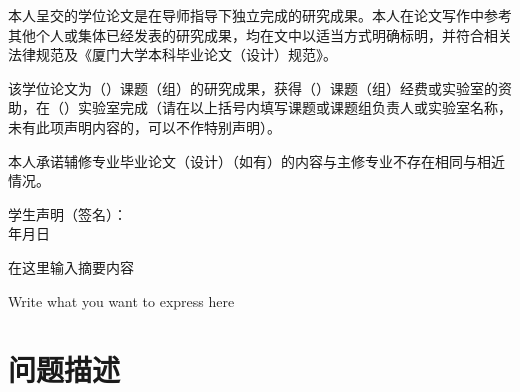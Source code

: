 \documentclass[14pt,a4paper]{xmuthesis}
\begin{document}
\begin{center}
\end{center}
\vspace{1cm}

本人呈交的学位论文是在导师指导下独立完成的研究成果。本人在论文写作中参考其他个人或集体已经发表的研究成果，均在文中以适当方式明确标明，并符合相关法律规范及《厦门大学本科毕业论文（设计）规范》。

该学位论文为（\hspace{13em}）课题（组）的研究成果，获得（\hspace{7em}）课题（组）经费或实验室的资助，在（\hspace{6em}）实验室完成（请在以上括号内填写课题或课题组负责人或实验室名称，未有此项声明内容的，可以不作特别声明）。

本人承诺辅修专业毕业论文（设计）（如有）的内容与主修专业不存在相同与相近情况。
\vspace{2cm}
\begin{flushleft}
    \hspace{16em}学生声明（签名）：\\
    \hspace{21em}年\hspace{2em}月\hspace{2em}日
\end{flushleft}
\thispagestyle{empty}
\addtocounter{pseudopage}{-1}


\normalsize
\begin{chineseabstract}

在这里输入摘要内容

\end{chineseabstract}

\begin{englishabstract}

Write what you want to express here

\end{englishabstract}

\thesistableofcontents



\chapter{问题描述}
\end{document}
